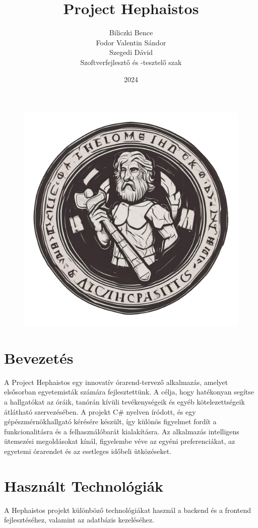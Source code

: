 \documentclass[colorlinks]{thesis-kando}
\theoremstyle{definition}
\theoremstyle{remark}
\begin{document}
\title{Project Hephaistos}

\author{Biliczki Bence\\Fodor Valentin Sándor\\Szegedi Dávid\\Szoftverfejlesztő és -tesztelő szak}

\date{2024}
\begin{figure}[h]
	\centering
	\includegraphics[width=0.5\linewidth]{figures/logo.png}
	\label{fig:minta}
\end{figure}
\maketitle

\tableofcontents

\pagebreak

\section*{Bevezetés}
A Project Hephaistos egy innovatív órarend-tervező alkalmazás, amelyet elsősorban egyetemisták számára fejlesztettünk. A célja, hogy hatékonyan segítse a hallgatókat az óráik, tanórán kívüli tevékenységeik és egyéb kötelezettségeik átlátható szervezésében. A projekt C\# nyelven íródott, és egy gépészmérnökhallgató kérésére készült, így különös figyelmet fordít a funkcionalitásra és a felhasználóbarát kialakításra. Az alkalmazás intelligens ütemezési megoldásokat kínál, figyelembe véve az egyéni preferenciákat, az egyetemi órarendet és az esetleges időbeli ütközéseket.

\section{Használt Technológiák}
A Hephaistos projekt különböző technológiákat használ a backend és a frontend fejlesztéséhez, valamint az adatbázis kezeléséhez.
\end{document}
